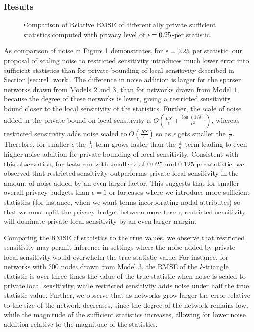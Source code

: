  \subsubsection{Results}
 \begin{figure}[hp]
 	\caption{Comparison of Relative RMSE of differentially private sufficient statistics computed with privacy level of $\epsilon = 0.25$-per statistic.} %
 	\label{fig:edge_noise}
 	\centering
 	

 \end{figure}
 
As comparison of noise in Figure \ref{fig:edge_noise} demonstrates, for $\epsilon = 0.25$ per statistic, our proposal of scaling noise to restricted sensitivity introduces much lower error into sufficient statistics than for private bounding of local sensitivity described in Section \ref{sec:rel_work}. The difference in noise addition is larger for the sparser networks drawn from Models $2$ and $3$, than for networks drawn from Model $1$, because the degree of these networks is lower, giving a restricted sensitivity bound closer to the local sensitivity of the statistics. Further, the scale of noise added in the private bound on local sensitivity is $O\left(\frac{LS}{\epsilon} + \frac{\log(1/\delta)}{\epsilon^2}\right)$, whereas restricted sensitivity adds noise scaled to $O\left(\frac{RS}{\epsilon}\right)$ so as $\epsilon$ gets smaller the $\frac{1}{\epsilon^2}$. Therefore, for smaller $\epsilon$ the $\frac{1}{\epsilon^2}$ term grows faster than the $\frac{1}{\epsilon}$ term leading to even higher noise addition for private bounding of local sensitivity. Consistent with this observation, for tests run with smaller $\epsilon$ of $0.025$ and $0.125$-per statistic, we observed that restricted sensitivity outperforms private local sensitivity in the amount of noise added by an even larger factor. This suggests that for smaller overall privacy budgets than $\epsilon=1$ or for cases where we introduce more sufficient statistics (for instance, when we want terms incorporating nodal attributes) so that we must split the privacy budget between more terms, restricted sensitivity will dominate private local sensitivity by an even larger margin.

Comparing the RMSE of statistics to the true values, we observe that restricted sensitivity may permit inference in settings where the noise added by private local sensitivity would overwhelm the true statistic value. For instance, for networks with $300$ nodes drawn from Model $3$, the RMSE of the $k$-triangle statistic is over three times the value of the true statistic when noise is scaled to private local sensitivity, while restricted sensitivity adds noise under half the true statistic value. Further, we observe that as networks grow larger the error relative to the size of the network decreases, since the degree of the network remains low, while the magnitude of the sufficient statistics increases, allowing for lower noise addition relative to the magnitude of the statistics.

